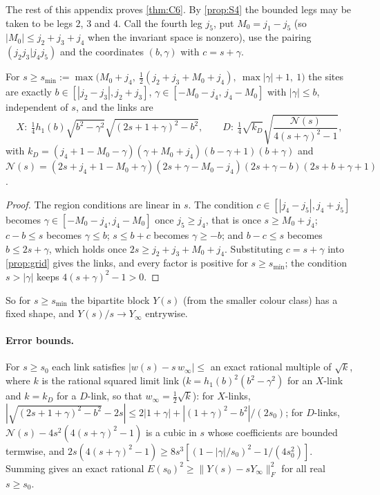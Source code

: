The rest of this appendix proves \cref{thm:C6}. By \cref{prop:S4} the bounded legs may
be taken to be legs $2$, $3$ and $4$. Call the fourth leg $j_5$, put $M_0=j_1-j_5$ (so $|M_0|\le j_2+j_3+j_4$ when the invariant
space is nonzero), use the pairing $(j_2j_3|j_4j_5)$ and the coordinates $(b,\gamma)$ with
$c=s+\gamma$.

\begin{lemma}\label{lem:stable}
For $s\ge s_{\min}:=\max\bigl(M_0+j_4,\ \frac12(j_2+j_3+M_0+j_4),\ \max|\gamma|+1,\ 1\bigr)$ the
sites are exactly $b\in[|j_2-j_3|,j_2+j_3]$, $\gamma\in[-M_0-j_4,\,j_4-M_0]$ with $|\gamma|\le b$,
independent of $s$, and the links are
\[
  X:\ \tfrac14h_1(b)\sqrt{b^2-\gamma^2}\sqrt{(2s+1+\gamma)^2-b^2},\qquad
  D:\ \tfrac14\sqrt{k_D}\sqrt{\frac{\mathcal N(s)}{4(s+\gamma)^2-1}},
\]
with $k_D=(j_4+1-M_0-\gamma)(\gamma+M_0+j_4)(b-\gamma+1)(b+\gamma)$ and
$\mathcal N(s)=(2s+j_4+1-M_0+\gamma)(2s+\gamma-M_0-j_4)(2s+\gamma-b)(2s+b+\gamma+1)$.
\end{lemma}

\begin{proof}
The region conditions are linear in $s$. The condition $c\in[|j_4-j_5|,j_4+j_5]$ becomes
$\gamma\in[-M_0-j_4,j_4-M_0]$ once $j_5\ge j_4$, that is once $s\ge M_0+j_4$; $c-b\le s$
becomes $\gamma\le b$; $s\le b+c$ becomes $\gamma\ge-b$; and $b-c\le s$ becomes
$b\le2s+\gamma$, which holds once $2s\ge j_2+j_3+M_0+j_4$. Substituting $c=s+\gamma$ into
\cref{prop:grid} gives the links, and every factor is positive for $s\ge s_{\min}$; the
condition $s>|\gamma|$ keeps $4(s+\gamma)^2-1>0$.
\end{proof}

So for $s\ge s_{\min}$ the bipartite block $Y(s)$ (from the smaller colour class) has a fixed
shape, and $Y(s)/s\to Y_\infty$ entrywise.

\paragraph{Error bounds.}
For $s\ge s_0$ each link satisfies $|w(s)-s\,w_\infty|\le$ an exact rational multiple of
$\sqrt{k}$, where $k$ is the rational squared limit link ($k=h_1(b)^2(b^2-\gamma^2)$ for an
$X$-link and $k=k_D$ for a $D$-link, so that $w_\infty=\frac12\sqrt k$): for $X$-links, $|\sqrt{(2s+1+\gamma)^2-b^2}-2s|\le2|1+\gamma|+|(1+\gamma)^2-b^2|/(2s_0)$;
for $D$-links, $\mathcal N(s)-4s^2(4(s+\gamma)^2-1)$ is a cubic in $s$ whose coefficients are
bounded termwise, and $2s(4(s+\gamma)^2-1)\ge8s^3[(1-|\gamma|/s_0)^2-1/(4s_0^2)]$. Summing gives
an exact rational $E(s_0)^2\ge\|Y(s)-sY_\infty\|_F^2$ for all real $s\ge s_0$.


